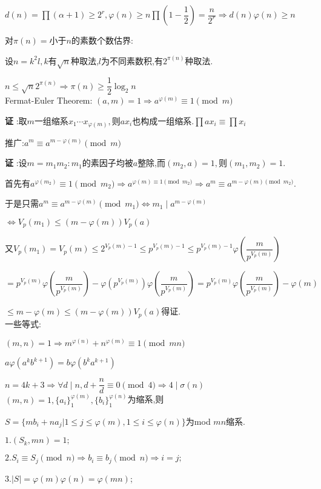$ d(n)=\prod{(\alpha+1)}\ge 2^r,\varphi(n)\ge n \prod{(1-\dfrac{1}{2})}=\dfrac{n}{2^r}\Rightarrow d(n)\varphi(n)\ge n$

对$ \pi(n)=$小于$ n$的素数个数估界: 

设$ n=k^2l,k$有$ \sqrt{n}$种取法,$ l$为不同素数积,有$ 2^{\pi(n)}$种取法.

$ n\le \sqrt{n}2^{\pi(n)}\Rightarrow \pi(n)\ge \dfrac{1}{2}\log_2n$
\\

Fermat-Euler Theorem:
$ (a,m)=1\Rightarrow a^{\varphi(m)}\equiv 1 \pmod m$

{\bf 证 }:取$ m$一组缩系$ x_1\cdots x_{\varphi(m)},$则$ ax_i$也构成一组缩系.$ \prod{ax_i}\equiv \prod{x_i}$

推广:$ a^m \equiv a^{m-\varphi(m)} \pmod m$

{\bf 证 }:设$ m=m_1m_2:m_1$的素因子均被$ a$整除,而$ (m_2,a)=1,$则$ (m_1,m_2)=1$.

首先有$ a^{\varphi(m_2)}\equiv 1 \pmod{m_2}\Rightarrow a^{\varphi(m)\equiv 1 \pmod{m_2}}\Rightarrow a^m\equiv a^{m-\varphi(m)\pmod{m_2}}$.

于是只需$ a^m\equiv a^{m-\varphi(m)}\pmod{m_1}\Leftrightarrow m_1\mid a^{m-\varphi(m)}$ 

$\Leftrightarrow V_p(m_1)\le (m-\varphi(m))V_p(a)$

又$ V_p(m_1)=V_p(m)\le2^{V_p(m)-1}\le p^{V_p(m)-1}\le p^{V_p(m)-1}\varphi(\dfrac{m}{p^{V_p(m)}})$ 

$=p^{V_p(m)}\varphi(\dfrac{m}{p^{V_p(m)}})-\varphi(p^{V_p(m)})\varphi(\dfrac{m}{p^{V_p(m)}})=p^{V_p(m)}\varphi(\dfrac{m}{p^{V_p(m)}})-\varphi(m)$ 

$\le m-\varphi(m)\le (m-\varphi(m))V_p(a)$得证.
\\

一些等式:

$ (m,n)=1\Rightarrow m^{\varphi(n)}+n^{\varphi(m)}\equiv 1 \pmod{mn}$

$ a\varphi(a^kb^{k+1})=b\varphi(b^ka^{k+1})$

$n=4k+3 \Rightarrow \forall d \mid n ,d+\dfrac{n}{d}\equiv 0 \pmod 4\Rightarrow 4 \mid \sigma(n)$
\\

$ (m,n)=1,\{ a_i\}_{1}^{\varphi(m)},\{ b_i\}_1^{\varphi(n)}$为缩系,则

$ S=\{ mb_i+na_j | 1\le j\le \varphi(m),1\le i \le \varphi(n)\}$为mod $ mn$缩系.

$ 1.(S_k,mn)=1; $ 

$ 2.S_i\equiv S_j \pmod n\Rightarrow b_i\equiv b_j \pmod n\Rightarrow i=j;$ 

$ 3.|S|=\varphi(m)\varphi(n)=\varphi(mn)$;
